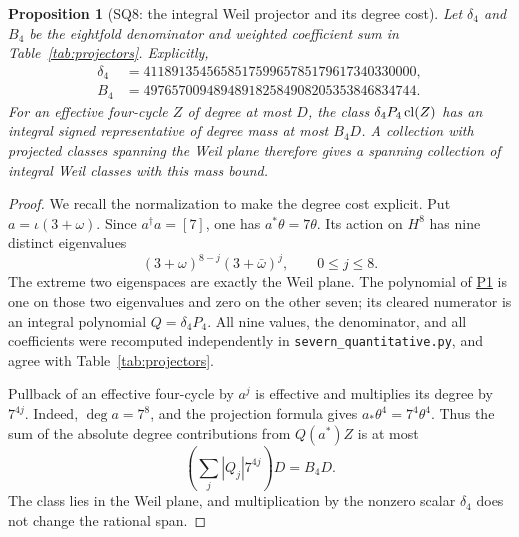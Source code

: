 \documentclass[11pt,a4paper]{article}
\newtheorem{proposition}[theorem]{Proposition}
\theoremstyle{definition}\newtheorem{definition}[theorem]{Definition}
\theoremstyle{remark}\newtheorem{remark}[theorem]{Remark}
\newcommand{\findingref}[1]{\hyperref[#1]{\textsf{#1}}}
\begin{document}
\begin{proposition}[SQ8: the integral Weil projector and its degree cost]\label{SQ8}
Let $\delta_4$ and $B_4$ be the eightfold denominator and weighted coefficient sum in Table~\ref{tab:projectors}. Explicitly,
\begin{align*}
 \delta_4&=411891354565851759965785179617340330000,\\
 B_4&=497657009489489182584908205353846834744.
\end{align*}
For an effective four-cycle $Z$ of degree at most $D$, the class $\delta_4P_4\operatorname{cl}(Z)$ has an integral signed representative of degree mass at most $B_4D$. A collection with projected classes spanning the Weil plane therefore gives a spanning collection of integral Weil classes with this mass bound.
\end{proposition}
\begin{proof}
We recall the normalization to make the degree cost explicit. Put $a=\iota(3+\omega)$. Since $a^\dagger a=[7]$, one has $a^*\theta=7\theta$. Its action on $H^8$ has nine distinct eigenvalues
\[
 (3+\omega)^{8-j}(3+\bar\omega)^j,\qquad 0\le j\le8.
\]
The extreme two eigenspaces are exactly the Weil plane. The polynomial of \findingref{P1} is one on those two eigenvalues and zero on the other seven; its cleared numerator is an integral polynomial $Q=\delta_4P_4$. All nine values, the denominator, and all coefficients were recomputed independently in \texttt{severn\_quantitative.py}, and agree with Table~\ref{tab:projectors}.

Pullback of an effective four-cycle by $a^j$ is effective and multiplies its degree by $7^{4j}$. Indeed, $\deg a=7^8$, and the projection formula gives $a_*\theta^4=7^4\theta^4$. Thus the sum of the absolute degree contributions from $Q(a^*)Z$ is at most
\[
 \left(\sum_j|Q_j|7^{4j}\right)D=B_4D.
\]
The class lies in the Weil plane, and multiplication by the nonzero scalar $\delta_4$ does not change the rational span.
\end{proof}
\end{document}

